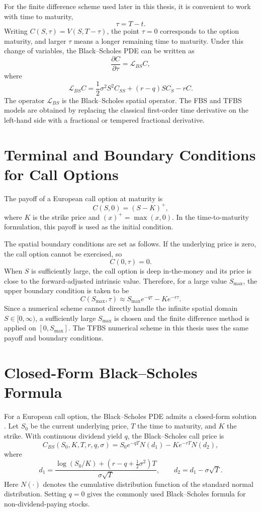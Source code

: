 \documentclass[11pt,a4paper]{report}
\begin{document}
For the finite difference scheme used later in this thesis, it is convenient to work with time to maturity,
\[
\tau = T-t.
\]
Writing $C(S,\tau)=V(S,T-\tau)$, the point $\tau=0$ corresponds to the option maturity, and larger $\tau$ means a longer remaining time to maturity. Under this change of variables, the Black--Scholes PDE can be written as
\[
\frac{\partial C}{\partial \tau}
=
\mathcal{L}_{BS} C,
\]
where
\[
\mathcal{L}_{BS} C
=
\frac{1}{2}\sigma^2 S^2 C_{SS}
+
(r-q)S C_S
-
rC.
\]
The operator $\mathcal{L}_{BS}$ is the Black--Scholes spatial operator. The FBS and TFBS models are obtained by replacing the classical first-order time derivative on the left-hand side with a fractional or tempered fractional derivative.

\section{Terminal and Boundary Conditions for Call Options}

The payoff of a European call option at maturity is
\[
C(S,0) = (S-K)^+,
\]
where $K$ is the strike price and $(x)^+=\max(x,0)$. In the time-to-maturity formulation, this payoff is used as the initial condition.

The spatial boundary conditions are set as follows. If the underlying price is zero, the call option cannot be exercised, so
\[
C(0,\tau)=0.
\]
When $S$ is sufficiently large, the call option is deep in-the-money and its price is close to the forward-adjusted intrinsic value. Therefore, for a large value $S_{\max}$, the upper boundary condition is taken to be
\[
C(S_{\max},\tau)
\approx
S_{\max}e^{-q\tau}
-
Ke^{-r\tau}.
\]
Since a numerical scheme cannot directly handle the infinite spatial domain $S\in[0,\infty)$, a sufficiently large $S_{\max}$ is chosen and the finite difference method is applied on $[0,S_{\max}]$. The TFBS numerical scheme in this thesis uses the same payoff and boundary conditions.

\section{Closed-Form Black--Scholes Formula}

For a European call option, the Black--Scholes PDE admits a closed-form solution \cite{BlackScholes1973,Merton1973}. Let $S_0$ be the current underlying price, $T$ the time to maturity, and $K$ the strike. With continuous dividend yield $q$, the Black--Scholes call price is
\[
C_{BS}(S_0,K,T,r,q,\sigma)
=
S_0 e^{-qT}N(d_1)
-
K e^{-rT}N(d_2),
\]
where
\[
d_1
=
\frac{
\log(S_0/K)
+
(r-q+\frac{1}{2}\sigma^2)T
}{
\sigma\sqrt{T}
},
\qquad
d_2=d_1-\sigma\sqrt{T}.
\]
Here $N(\cdot)$ denotes the cumulative distribution function of the standard normal distribution. Setting $q=0$ gives the commonly used Black--Scholes formula for non-dividend-paying stocks.
\end{document}

